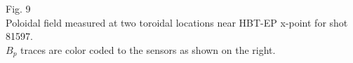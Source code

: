 \documentclass{article}
\begin{document}
\begin{multicols}{5}
\begin{itemize}
\begin{center}
Fig. 9\\
Poloidal field measured at two toroidal locations near HBT-EP x-point for shot 81597.\\
$B_p$ traces are color coded to the sensors as shown on the right.\\
\end{center}

\end{itemize}

\end{multicols}
\end{document}
